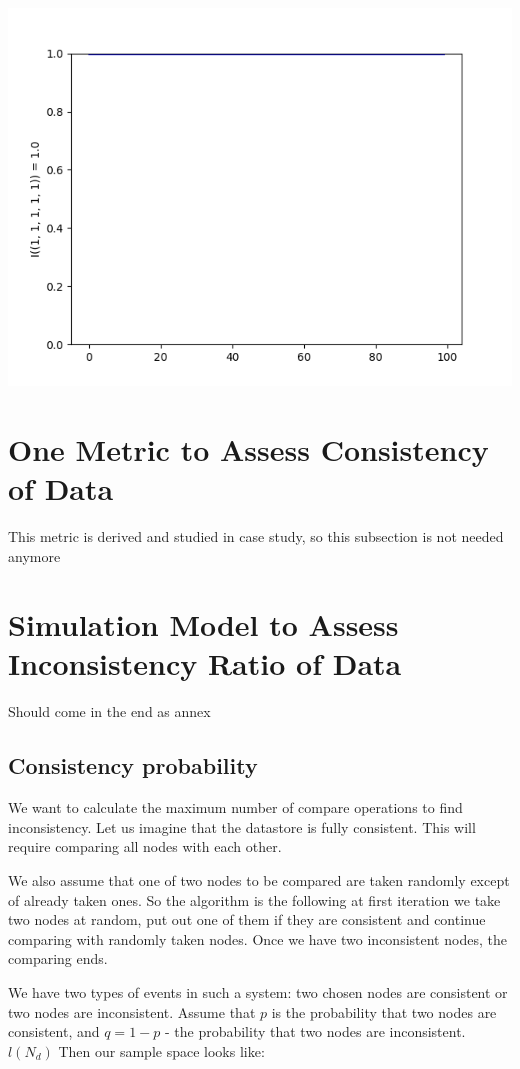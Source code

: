 \documentclass{llncs}
\begin{document}
\includegraphics[scale=0.4]{images/1-1-1-1-1-consistent-partitions-probability.png}

\section{One Metric to Assess Consistency of Data}
{\color{red} This metric is derived and studied in case study, so this subsection is not needed anymore}
\section{Simulation Model to Assess Inconsistency Ratio of Data}
{\color{red} Should come in the end as annex}

\subsection{Consistency probability}

We want to calculate the maximum number of compare operations to find inconsistency. Let us imagine that the datastore is fully consistent. This will require comparing all nodes with each other.

We also assume that one of two nodes to be compared are taken randomly except of already taken ones. So the algorithm is the following at first iteration we take two nodes at random, put out one of them if they are consistent and continue comparing with randomly taken nodes. Once we have two inconsistent nodes, the comparing ends.

We have two types of events in such a system: two chosen nodes are consistent or two nodes are inconsistent.
Assume that $p$ is the probability that two nodes are consistent, and
$q = 1 -p$ - the probability that two nodes are inconsistent.
$l(N_d)$
Then our sample space looks like:
\end{document}
